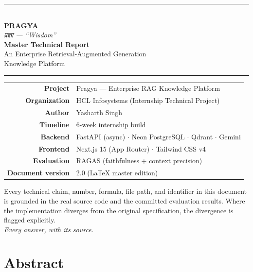 \documentclass[11pt,a4paper,oneside]{report}
\begin{document}

\begin{titlepage}
\centering
\vspace*{1.2cm}

{\color{ink}\rule{\linewidth}{1.2pt}}\\[6pt]
{\Huge\bfseries\color{ink} PRAGYA}\\[6pt]
{\Large\color{amberdark}\itshape प्रज्ञा — ``Wisdom''}\\[10pt]
{\LARGE\bfseries\color{ink} Master Technical Report}\\[6pt]
{\large An Enterprise Retrieval-Augmented Generation\\ Knowledge Platform}\\[8pt]
{\color{ink}\rule{\linewidth}{1.2pt}}

\vfill

\begin{tabular}{rl}
\toprule
\textbf{Project} & Pragya — Enterprise RAG Knowledge Platform\\
\textbf{Organization} & HCL Infosystems (Internship Technical Project)\\
\textbf{Author} & Yasharth Singh\\
\textbf{Timeline} & 6-week internship build\\
\textbf{Backend} & FastAPI (async) $\cdot$ Neon PostgreSQL $\cdot$ Qdrant $\cdot$ Gemini\\
\textbf{Frontend} & Next.js 15 (App Router) $\cdot$ Tailwind CSS v4\\
\textbf{Evaluation} & RAGAS (faithfulness + context precision)\\
\textbf{Document version} & 2.0 (LaTeX master edition)\\
\bottomrule
\end{tabular}

\vfill
{\small\color{muted} Every technical claim, number, formula, file path, and identifier in
this document is grounded in the real source code and the committed evaluation results.
Where the implementation diverges from the original specification, the divergence is
flagged explicitly.}\\[10pt]
{\itshape\color{amberdark} Every answer, with its source.}
\end{titlepage}

\chapter*{Abstract}
\end{document}
